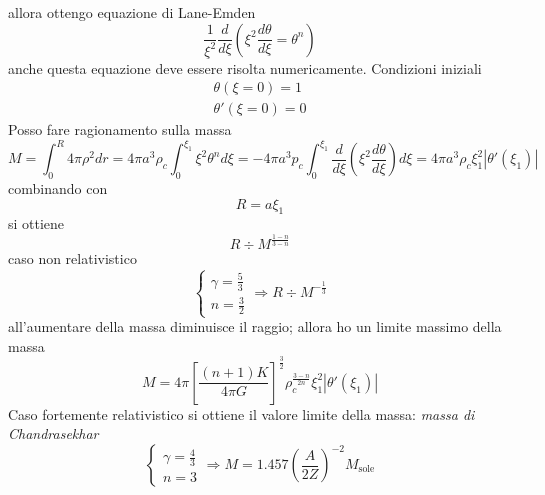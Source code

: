 allora ottengo equazione di Lane-Emden
\begin{equation*}
    \frac{1}{\xi^2}\frac{d}{d\xi}\left(\xi^2 \frac{d\theta}{d\xi} = \theta^n\right)
\end{equation*}
anche questa equazione deve essere risolta numericamente. Condizioni iniziali
\begin{gather*}
    \theta (\xi=0) = 1 \\
    \theta'(\xi=0) = 0 
\end{gather*}
Posso fare ragionamento sulla massa
\begin{equation*}
    M = \int_0^R 4\pi \rho^2dr = 4\pi a^3\rho_c \int_0^{\xi_1} \xi^2\theta^n d\xi = -4\pi a^3 p_c \int_0^{\xi_1} \frac{d}{d\xi} \left(\xi^2 \frac{d\theta}{d\xi}\right) d\xi = 4\pi a^3 \rho_c \xi^2_1 |\theta' (\xi_1)| 
\end{equation*}
combinando con 
\begin{equation*}
    R = a \xi_1
\end{equation*}
si ottiene 
\begin{equation*}
    R \div M^{\frac{1-n}{3-n}}
\end{equation*}
caso non relativistico
\begin{equation*}
    \begin{cases}
        \gamma = \frac{5}{3} \\
        n = \frac{3}{2}
    \end{cases}
    \Rightarrow R \div M^{-\frac{1}{3}}
\end{equation*}
all'aumentare della massa diminuisce il raggio; allora ho un limite massimo della massa 
\begin{equation*}
    M = 4\pi {\left[\frac{(n+1)K}{4\pi G }\right]}^\frac{3}{2} \rho_c^{\frac{3-n}{2n}}\xi^2_1 |\theta'(\xi_1)|
\end{equation*}
Caso fortemente relativistico si ottiene il valore limite della massa: \textit{massa di Chandrasekhar}
\begin{equation*}
    \begin{cases}
        \gamma = \frac{4}{3} \\
        n = 3
    \end{cases}
    \Rightarrow M = 1.457 {\left(\frac{A}{2Z}\right)}^{-2}M_{\mbox{sole}}
\end{equation*}

